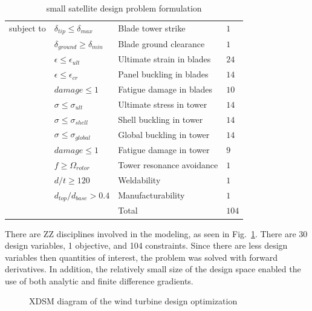 \documentclass[]{aiaa-tc} %
\begin{document}
\begin{table}
\begin{tabular}{r l l l}
            \\
            subject to          & $\delta_{tip} \le \delta_{max}$ & Blade tower strike & $1$ \\
                                    & $\delta_{ground} \ge \delta_{min}$ & Blade ground clearance & $1$ \\
                                    & $\epsilon \le \epsilon_{ult}$ & Ultimate strain in blades & $24$ \\
                                    & $\epsilon \le \epsilon_{cr}$ & Panel buckling in blades & $14$ \\
                                    & $damage \le 1$ & Fatigue damage in blades & $10$ \\
                                    & $\sigma \le \sigma_{ult}$ & Ultimate stress in tower & $14$ \\
                                    & $\sigma \le \sigma_{shell}$ & Shell buckling in tower & $14$ \\
                                    & $\sigma \le \sigma_{global}$ & Global buckling in tower & $14$ \\
                                    & $damage \le 1$ & Fatigue damage in tower & $9$ \\
                                    & $f \ge \Omega_{rotor}$ & Tower resonance avoidance & $1$ \\
                                    & $d/t \ge 120$ & Weldability & $1$ \\
                                    & $d_{top}/d_{base} > 0.4$ & Manufacturability & $1$ \\
                                    & & Total & $104$ \\
            \hline
        \end{tabular}
        \caption{small satellite design problem formulation}
        \label{tab:coe_formulation}
    \end{table}

    There are ZZ disciplines involved in the modeling, as seen in Fig.~\ref{fig:xdsm_wt}.
    There are 30 design variables, 1 objective, and 104 constraints. Since there are
    less design variables then quantities of interest, the problem was solved with
    forward derivatives. In addition, the relatively small size of the design space
    enabled the use of both analytic and finite difference gradients.


    \begin{figure}[!htbp]
        \caption{XDSM diagram of the wind turbine design optimization}
        \label{fig:xdsm_wt}
    \end{figure}
\end{document}
